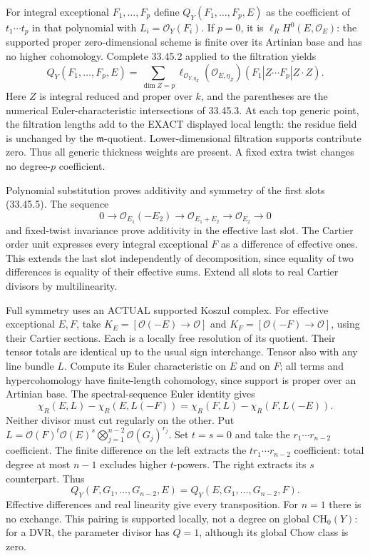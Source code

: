 \documentclass[11pt]{article}
\begin{document}
For integral exceptional \(F_1,\ldots,F_p\) define \(Q_Y(F_1,\ldots,F_p,E)\) as the coefficient of \(t_1\cdots t_p\) in that polynomial with \(L_i=\mathcal O_Y(F_i)\). If \(p=0\), it is \(\ell_R H^0(E,\mathcal O_E)\): the supported proper zero-dimensional scheme is finite over its Artinian base and has no higher cohomology. Complete 33.45.2 applied to the filtration yields
\[
Q_Y(F_1,\ldots,F_p,E)
=\sum_{\dim Z=p}\ell_{\mathcal O_{Y,\eta_Z}}(\mathcal O_{E,\eta_Z})
 (F_1|Z\cdots F_p|Z\cdot Z). \tag{C}
\]
Here \(Z\) is integral reduced and proper over \(k\), and the parentheses are the numerical Euler-characteristic intersections of 33.45.3. At each top generic point, the filtration lengths add to the EXACT displayed local length: the residue field is unchanged by the \(\mathfrak m\)-quotient. Lower-dimensional filtration supports contribute zero. Thus all generic thickness weights are present. A fixed extra twist changes no degree-\(p\) coefficient.

Polynomial substitution proves additivity and symmetry of the first slots (33.45.5). The sequence
\[
0\longrightarrow\mathcal O_{E_1}(-E_2)
\longrightarrow\mathcal O_{E_1+E_2}
\longrightarrow\mathcal O_{E_2}\longrightarrow0
\]
and fixed-twist invariance prove additivity in the effective last slot. The Cartier order unit expresses every integral exceptional \(F\) as a difference of effective ones. This extends the last slot independently of decomposition, since equality of two differences is equality of their effective sums. Extend all slots to real Cartier divisors by multilinearity.

Full symmetry uses an ACTUAL supported Koszul complex. For effective exceptional \(E,F\), take \(K_E=[\mathcal O(-E)\to\mathcal O]\) and \(K_F=[\mathcal O(-F)\to\mathcal O]\), using their Cartier sections. Each is a locally free resolution of its quotient. Their tensor totals are identical up to the usual sign interchange. Tensor also with any line bundle \(L\). Compute its Euler characteristic on \(E\) and on \(F\); all terms and hypercohomology have finite-length cohomology, since support is proper over an Artinian base. The spectral-sequence Euler identity gives
\[
\chi_R(E,L)-\chi_R(E,L(-F))
=\chi_R(F,L)-\chi_R(F,L(-E)). \tag{K}
\]
Neither divisor must cut regularly on the other. Put
\(L=\mathcal O(F)^t\mathcal O(E)^s\bigotimes_{j=1}^{n-2}\mathcal O(G_j)^{r_j}\).
Set \(t=s=0\) and take the \(r_1\cdots r_{n-2}\) coefficient. The finite difference on the left extracts the \(t r_1\cdots r_{n-2}\) coefficient: total degree at most \(n-1\) excludes higher \(t\)-powers. The right extracts its \(s\) counterpart. Thus
\[
Q_Y(F,G_1,\ldots,G_{n-2},E)=Q_Y(E,G_1,\ldots,G_{n-2},F).
\]
Effective differences and real linearity give every transposition. For \(n=1\) there is no exchange. This pairing is supported locally, not a degree on global \(\mathrm{CH}_0(Y)\): for a DVR, the parameter divisor has \(Q=1\), although its global Chow class is zero.
\end{document}
